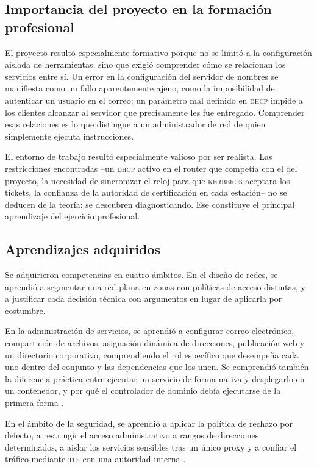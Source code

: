 \subsection{Importancia del proyecto en la formaci\'on profesional}

El proyecto result\'o especialmente formativo porque no se limit\'o a la
configuraci\'on aislada de herramientas, sino que exigi\'o comprender c\'omo
se relacionan los servicios entre s\'i. Un error en la configuraci\'on del
servidor de nombres se manifiesta como un fallo aparentemente ajeno, como
la imposibilidad de autenticar un usuario en el correo; un par\'ametro
mal definido en \textsc{dhcp} impide a los clientes alcanzar al servidor que
precisamente les fue entregado. Comprender esas relaciones es lo que
distingue a un administrador de red de quien simplemente ejecuta
instrucciones.

El entorno de trabajo result\'o especialmente valioso por ser
realista. Las restricciones encontradas --un \textsc{dhcp} activo en el
router que compet\'ia con el del proyecto, la necesidad de sincronizar el
reloj para que \textsc{kerberos} aceptara los tickets, la confianza de la
autoridad de certificaci\'on en cada estaci\'on-- no se deducen de la
teor\'ia: se descubren diagnosticando. Ese constituye el principal
aprendizaje del ejercicio profesional.

\subsection{Aprendizajes adquiridos}

Se adquirieron competencias en cuatro \'ambitos. En el dise\~no de redes,
se aprendi\'o a segmentar una red plana en zonas con pol\'iticas de acceso
distintas, y a justificar cada decisi\'on t\'ecnica con argumentos en lugar
de aplicarla por costumbre.

En la administraci\'on de servicios, se aprendi\'o a configurar correo
electr\'onico, compartici\'on de archivos, asignaci\'on din\'amica de
direcciones, publicaci\'on web y un directorio corporativo,
comprendiendo el rol espec\'ifico que desempeña cada uno dentro del conjunto y
las dependencias que los unen. Se comprendi\'o tambi\'en la diferencia
pr\'actica entre ejecutar un servicio de forma nativa y desplegarlo en un
contenedor, y por qu\'e el controlador de dominio deb\'ia ejecutarse de la
primera forma \cite{sambateam2024}.

En el \'ambito de la seguridad, se aprendi\'o a aplicar la pol\'itica de
rechazo por defecto, a restringir el acceso administrativo a rangos de
direcciones determinados, a aislar los servicios sensibles tras un \'unico
proxy y a confiar el tr\'afico mediante \textsc{tls} con una autoridad
interna \cite{stewart2017}.

